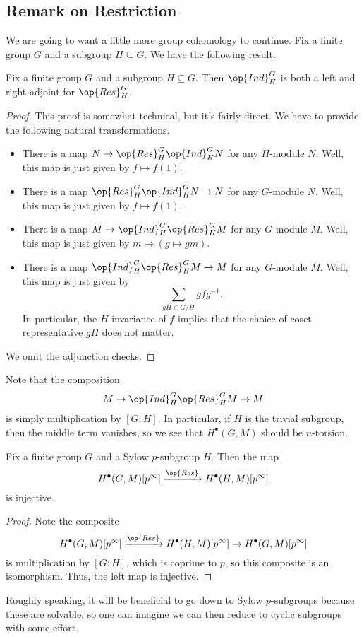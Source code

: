 \documentclass[../notes.tex]{subfiles}
\begin{document}
\subsection{Remark on Restriction}
We are going to want a little more group cohomology to continue. Fix a finite group $G$ and a subgroup $H\subseteq G$. We have the following result.
\begin{proposition}
	Fix a finite group $G$ and a subgroup $H\subseteq G$. Then $\op{Ind}^G_H$ is both a left and right adjoint for $\op{Res}^G_H$.
\end{proposition}
\begin{proof}
	This proof is somewhat technical, but it's fairly direct. We have to provide the following natural transformations.
	\begin{itemize}
		\item There is a map $N\to\op{Res}^G_H\op{Ind}^G_HN$ for any $H$-module $N$. Well, this map is just given by $f\mapsto f(1)$.
		\item There is a map $\op{Res}^G_H\op{Ind}^G_HN\to N$ for any $G$-module $N$. Well, this map is just given by $f\mapsto f(1)$.
		\item There is a map $M\to\op{Ind}^G_H\op{Res}^G_HM$ for any $G$-module $M$. Well, this map is just given by $m\mapsto(g\mapsto gm)$.
		\item There is a map $\op{Ind}^G_H\op{Res}^G_HM\to M$ for any $G$-module $M$. Well, this map is just given by
		\[\sum_{gH\in G/H}gfg^{-1}.\]
		In particular, the $H$-invariance of $f$ implies that the choice of coset representative $gH$ does not matter.
	\end{itemize}
	We omit the adjunction checks.
\end{proof}
\begin{remark}
	Note that the composition
	\[M\to\op{Ind}^G_H\op{Res}^G_HM\to M\]
	is simply multiplication by $[G:H]$. In particular, if $H$ is the trivial subgroup, then the middle term vanishes, so we see that $H^\bullet(G,M)$ should be $n$-torsion.
\end{remark}
\begin{corollary} \label{cor:res-is-inj}
	Fix a finite group $G$ and a Sylow $p$-subgroup $H$. Then the map
	\[H^\bullet(G,M)[p^\infty]\xrightarrow{\op{Res}}H^\bullet(H,M)[p^\infty]\]
	is injective.
\end{corollary}
\begin{proof}
	Note the composite
	\[H^\bullet(G,M)[p^\infty]\xrightarrow{\op{Res}}H^\bullet(H,M)[p^\infty]\to H^\bullet(G,M)[p^\infty]\]
	is multiplication by $[G:H]$, which is coprime to $p$, so this composite is an isomorphism. Thus, the left map is injective.
\end{proof}
\begin{remark}
	Roughly speaking, it will be beneficial to go down to Sylow $p$-subgroups because these are solvable, so one can imagine we can then reduce to cyclic subgroups with some effort.
\end{remark}
\end{document}
